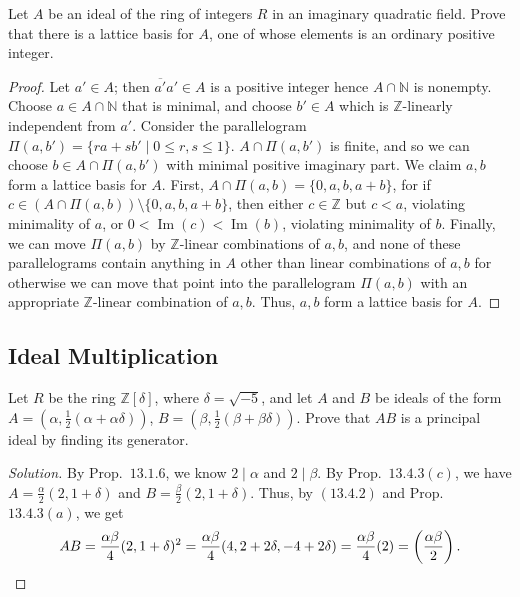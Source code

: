 \documentclass[12pt]{article}
\theoremstyle{remark}
\begin{document}
\begin{problem}
  Let $A$ be an ideal of the ring of integers $R$ in an imaginary quadratic field. Prove that there is a lattice basis for $A$, one of whose elements is an ordinary positive integer.
\end{problem}
\begin{proof}
  Let $a' \in A$; then $\overline{a'}a'\in A$ is a positive integer hence $A \cap \mathbb{N}$ is nonempty. Choose $a \in A \cap \mathbb{N}$ that is minimal, and choose $b' \in A$ which is $\mathbb{Z}$-linearly independent from $a'$. Consider the parallelogram $\Pi(a,b') = \{ra+sb' \mid 0 \le r,s \le 1\}$. $A \cap \Pi(a,b')$ is finite, and so we can choose $b \in A \cap \Pi(a,b')$ with minimal positive imaginary part. We claim $a,b$ form a lattice basis for $A$. First, $A \cap \Pi(a,b) = \{0,a,b,a+b\}$, for if $c \in (A \cap \Pi(a,b)) \setminus \{0,a,b,a+b\}$, then either   $c \in \mathbb{Z}$ but $c < a$, violating minimality of $a$, or $0 < \operatorname{Im}(c)<\operatorname{Im}(b)$, violating minimality of $b$. Finally, we can move $\Pi(a,b)$ by $\mathbb{Z}$-linear combinations of $a,b$, and none of these parallelograms contain anything in $A$ other than linear combinations of $a,b$ for otherwise we can move that point into the parallelogram $\Pi(a,b)$ with an appropriate $\mathbb{Z}$-linear combination of $a,b$. Thus, $a,b$ form a lattice basis for $A$.
\end{proof}

\subsection{Ideal Multiplication}
\setcounter{subsubsection}{2}
\begin{problem}
  Let $R$ be the ring $\mathbb{Z}[\delta]$, where $\delta = \sqrt{-5}$, and let $A$ and $B$ be ideals of the form $A = (\alpha, \frac{1}{2}(\alpha + \alpha\delta))$, $B = (\beta, \frac{1}{2}(\beta +\beta\delta))$.  Prove that $AB$ is a principal ideal by finding its generator.
\end{problem}
\begin{proof}[Solution]
  By Prop.~$13.1.6$, we know $2 \mid \alpha$ and $2 \mid \beta$. By Prop.~$13.4.3(c)$, we have $A = \frac{\alpha}{2}(2,1+\delta)$ and $B = \frac{\beta}{2}(2,1+\delta)$. Thus, by $(13.4.2)$ and Prop.~$13.4.3(a)$, we get
  \begin{equation*}
    AB = \frac{\alpha\beta}{4}(2,1+\delta)^2 = \frac{\alpha\beta}{4}(4,2+2\delta,-4+2\delta) = \frac{\alpha\beta}{4}(2) = \left(\frac{\alpha\beta}{2}\right).\qedhere
  \end{equation*}
\end{proof}
\end{document}
